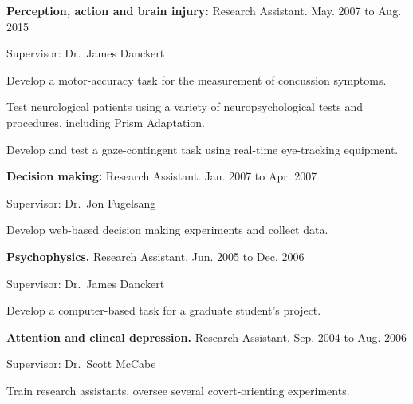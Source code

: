 \documentclass[10pt]{article}
\newenvironment{innerlist}[1][\enskip\textbullet]%
        {\begin{compactenum}[#1]}{\end{compactenum}}
\begin{document}
\begin{outerlist}
\itemsep1pt\parskip0pt
\item
  \textbf{Perception, action and brain injury:} Research Assistant.
  \hfill May. 2007 to Aug. 2015
\item
  Supervisor: Dr.~James Danckert

 \begin{innerlist}
  \itemsep1pt\parskip0pt
  \item
    Develop a motor-accuracy task for the measurement of concussion
    symptoms.
  \item
    Test neurological patients using a variety of neuropsychological
    tests and procedures, including Prism Adaptation.
  \item
    Develop and test a gaze-contingent task using real-time eye-tracking
    equipment.
 \end{innerlist}
\item
  \textbf{Decision making:} Research Assistant.
  \hfill                           Jan. 2007 to Apr. 2007

 \begin{innerlist}
  \itemsep1pt\parskip0pt
  \item
    Supervisor: Dr.~Jon Fugelsang
  \item
    Develop web-based decision making experiments and collect data.
 \end{innerlist}
\item
  \textbf{Psychophysics.} Research Assistant.
  \hfill                           Jun. 2005 to Dec. 2006

 \begin{innerlist}
  \itemsep1pt\parskip0pt
  \item
    Supervisor: Dr.~James Danckert
  \item
    Develop a computer-based task for a graduate student's project.
 \end{innerlist}
\item
  \textbf{Attention and clincal depression.} Research Assistant.
  \hfill                       Sep. 2004 to Aug. 2006

 \begin{innerlist}
  \itemsep1pt\parskip0pt
  \item
    Supervisor: Dr.~Scott McCabe
  \item
    Train research assistants, oversee several covert-orienting
    experiments.
 \end{innerlist}
\end{outerlist}
\end{document}

